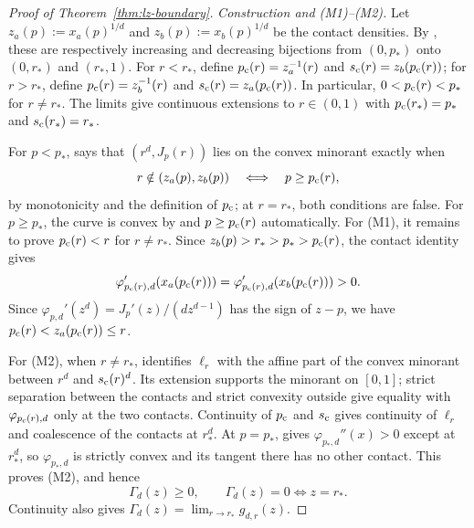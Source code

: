 \begin{proof}[Proof of Theorem~\ref{thm:lz-boundary}]
\emph{Construction and (M1)--(M2).}
Let $z_a(p):=x_a(p)^{1/d}$ and $z_b(p):=x_b(p)^{1/d}$ be the contact densities.
By , these are respectively increasing and decreasing
bijections from $(0,p_*)$ onto $(0,r_*)$ and $(r_*,1)$.
For $r<r_*$, define $\pc(r)=z_a^{-1}(r)$ and $\sc(r)=z_b(\pc(r))$;
for $r>r_*$, define $\pc(r)=z_b^{-1}(r)$ and $\sc(r)=z_a(\pc(r))$.
In particular, $0<\pc(r)<p_*$ for $r\ne r_*$.
The limits give continuous extensions to $r \in (0,1)$ with
$\pc(r_*)=p_*$ and $\sc(r_*)=r_*$.

For $p<p_*$,  says that $(r^d,J_p(r))$ lies on the
convex minorant exactly when
\[
  r\notin(z_a(p),z_b(p))
  \quad\Longleftrightarrow\quad p\ge\pc(r),
\]
by monotonicity and the definition of $\pc$; at $r=r_*$, both conditions
are false.  For $p\ge p_*$, the curve is convex by
 and $p\ge\pc(r)$ automatically.
For (M1), it remains to prove $\pc(r)<r$ for $r\ne r_*$.
Since $z_b(p)>r_*>p_*>\pc(r)$, the contact identity gives
\[
  \varphi_{\pc(r),d}'(x_a(\pc(r)))=\varphi_{\pc(r),d}'(x_b(\pc(r)))>0.
\]
Since $\varphi_{p,d}'(z^d)=J_p'(z)/(d z^{d-1})$ has the sign of $z-p$,
we have $\pc(r)<z_a(\pc(r))\le r$.

For (M2), when $r\ne r_*$,  identifies $\ell_r$
with the affine part of the convex minorant between $r^d$ and $\sc(r)^d$.
Its extension supports the minorant on $[0,1]$; strict separation between
the contacts and strict convexity outside give equality with
$\varphi_{\pc(r),d}$ only at the two contacts.
Continuity of $\pc$ and $\sc$ gives continuity of $\ell_r$ and coalescence
of the contacts at $r_*^d$.  At $p=p_*$,  gives
$\varphi_{p_*,d}''(x)>0$ except at $r_*^d$, so $\varphi_{p_*,d}$ is strictly
convex and its tangent there has no other contact.  This proves (M2), and hence
\begin{equation}\label{eq:endpoint-gap-positivity}
  \Gamma_d(z)\ge0,
  \qquad
  \Gamma_d(z)=0\iff z=r_*.
\end{equation}
Continuity also gives $\Gamma_d(z)=\lim_{r\to r_*}g_{d,r}(z)$.


\end{proof}
